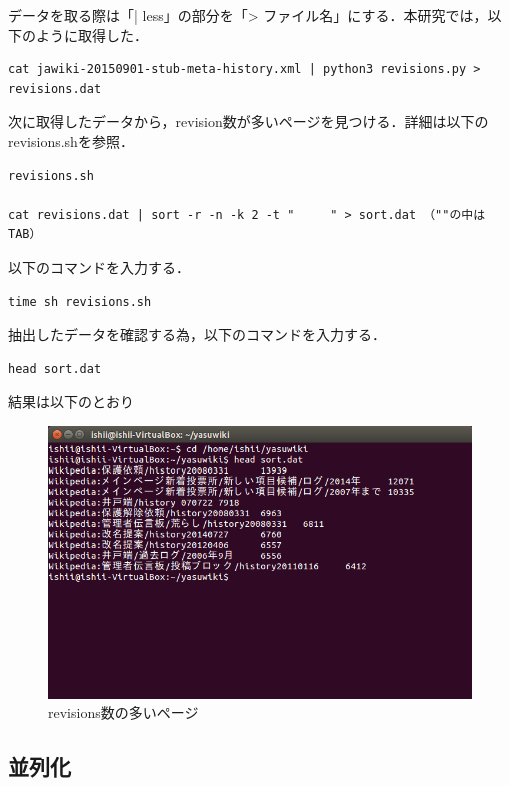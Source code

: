 データを取る際は「| less」の部分を「> ファイル名」にする．本研究では，以下のように取得した．

{\small
\begin{verbatim}
cat jawiki-20150901-stub-meta-history.xml | python3 revisions.py > revisions.dat
\end{verbatim}}




次に取得したデータから，revision数が多いページを見つける．詳細は以下のrevisions.shを参照． \\

{\small
\begin{verbatim}
revisions.sh

cat revisions.dat | sort -r -n -k 2 -t "	 " > sort.dat （""の中はTAB）
\end{verbatim}}

以下のコマンドを入力する．

{\small
\begin{verbatim}
time sh revisions.sh
\end{verbatim}}


抽出したデータを確認する為，以下のコマンドを入力する．

{\small
\begin{verbatim}
head sort.dat
\end{verbatim}}


結果は以下のとおり

\begin{figure}[H]
\centering
\includegraphics[width=14cm]{head_sort.png}
\caption{revisions数の多いページ}\label{サンプル図}
\end{figure}




\subsection{並列化}

